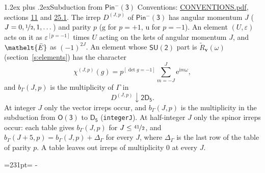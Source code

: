 \documentclass[10pt,a4paper]{article}
\makeatletter
\renewcommand\section{\@startsection{section}{1}{\z@}{-3ex plus -1ex minus -.2ex}%
  {1.2ex plus .2ex}{\normalfont\large\sffamily\bfseries\color{parttitle}}}
\newcommand{\needspace}[1]{\par\penalty-100\begingroup\dimen0=#1\relax\dimen2=\pagegoal
  \advance\dimen2-\pagetotal\ifdim\dimen0>\dimen2\relax\ifdim\dimen2>0pt\vfil\break\fi\fi
  \endgroup}
\numberwithin{equation}{section}
\newcommand{\eltfont}[1]{{\let\sigma\eltsigma\mathelt{#1}}}
\newcommand{\grp}[1]{\mathsf{#1}}
\newcommand{\elt}[1]{\eltfont{#1}}
\newcommand{\ptag}[1]{\mathrm{#1}}
\newcommand{\iverson}[1]{[#1]}
\newcommand{\restr}[2]{#1\!\downarrow#2}
\newcommand{\vv}{\mathbf{v}}
\newcommand{\iunit}{\mathrm{i}}
\newcommand{\expe}{\mathrm{e}}
\newcommand{\irrJp}[2]{D^{(#1,#2)}}
\newcommand{\barred}[1]{\bar{#1}}
\newcommand{\lift}[1]{\tilde{#1}}
\makeatother
\begin{document}
\section{Subduction from \texorpdfstring{$\grp{Pin^{-}(3)}$}{Pin(3)}}\label{s:subduction_parent}
Conventions: \href{../../CONVENTIONS.pdf}{CONVENTIONS.pdf}, sections \href{../../../rotation/CONVENTIONS.pdf\#conv.11}{11} and \href{../../CONVENTIONS.pdf\#conv.25.1}{25.1}.
\leavevmode\label{n:index.J}\label{n:index.parity}\label{n:irrep.o3}The irrep $\irrJp{J}{p}$ of \href{Pinminus3.pdf}{$\grp{Pin^{-}(3)}$} has angular momentum $J$ ($J = 0, \nicefrac{1}{2}, 1, \dots$) and parity $p$ ($\ptag{g}$ for $p = +1$, $\ptag{u}$ for $p = -1$). An element $(U, \varepsilon)$ acts on it as $\varepsilon^{[p = -1]}$ times $U$ acting on the kets of angular momentum $J$, and $\elt{\barred{E}}$ as $(-1)^{2J}$. \label{n:function.character.parent}\label{n:function.multiplicity}An element whose $\grp{SU(2)}$ part is $\lift{R}_{\vv}(\omega)$ (section~\ref{s:elements}) has the character
\begin{equation}\label{e:chi}\chi^{(J,p)}(g) = p^{\iverson{\det g = -1}}\sum_{m=-J}^{J} \expe^{\iunit m\omega},\end{equation}
and $b_\Gamma(J, p)$ is the multiplicity of $\Gamma$ in
\begin{equation}\label{e:parent}\restr{\irrJp{J}{p}}{\grp{2D_{5}}}.\end{equation}
At integer $J$ only the vector irreps occur, and $b_\Gamma(J, p)$ is the multiplicity in the subduction from $\grp{O(3)}$ to \href{../../../rotation/data/pdf/D5.pdf}{$\grp{D_{5}}$} (\texttt{integerJ}). \label{n:index.increment}At half-integer $J$ only the spinor irreps occur: each table gives $b_\Gamma(J, p)$ for $J \le \nicefrac{41}{2}$, and $b_\Gamma(J + 5, p) = b_\Gamma(J, p) + \Delta_\Gamma$ for every $J$, where $\Delta_\Gamma$ is the last row of the table of parity $p$. A table leaves out irreps of multiplicity 0 at every $J$.
\needspace{231pt}
\end{document}
